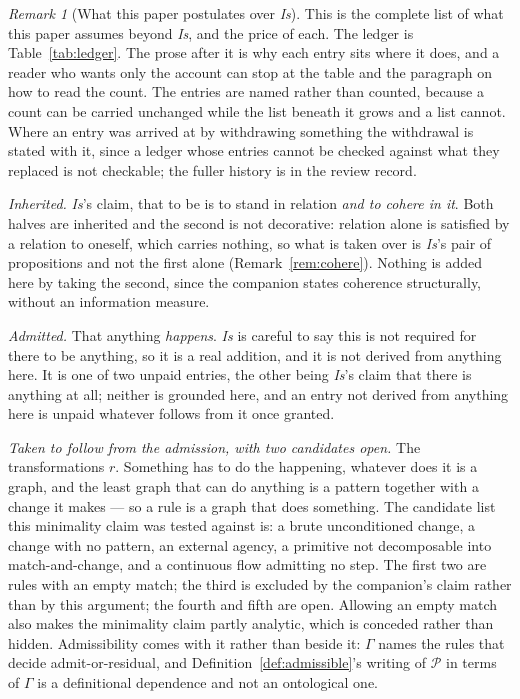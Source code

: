 \documentclass[11pt,a4paper]{article}
\theoremstyle{remark}\newtheorem{remark}[definition]{Remark}
\newcommand{\Poss}{\mathcal{P}}
\begin{document}
\begin{remark}[What this paper postulates over \emph{Is}]\label{rem:inherited}
This is the complete list of what this paper assumes beyond \emph{Is}, and the price of each.
The ledger is Table~\ref{tab:ledger}. The prose after it is why each entry sits where it does, and a reader who wants
only the account can stop at the table and the paragraph on how to read the count. The entries are named
rather than counted, because a count can be carried unchanged while the list beneath it grows and a list
cannot. Where an entry was arrived at by withdrawing something the withdrawal is stated with it, since a
ledger whose entries cannot be checked against what they replaced is not checkable; the fuller history is
in the review record.

\emph{Inherited.} \emph{Is}'s claim, that to be is to stand in relation \emph{and to cohere in it}.
Both halves are inherited and the second is not decorative: relation alone is satisfied by a relation to
oneself, which carries nothing, so what is taken over is \emph{Is}'s pair of propositions and not
the first alone (Remark~\ref{rem:cohere}). Nothing is added here by taking the second, since the
companion states coherence structurally, without an information measure.

\emph{Admitted.} That anything \emph{happens}. \emph{Is} is careful to say this is not required for
there to be anything, so it is a real addition, and it is not derived from anything here. It is one of
two unpaid entries, the other being \emph{Is}'s claim that there is anything at all; neither is
grounded here, and an entry not derived from anything here is unpaid whatever follows from it once
granted.

\emph{Taken to follow from the admission, with two candidates open.} The transformations $r$. Something has to do the happening, whatever
does it is a graph, and the least graph that can do anything is a pattern together with a change it
makes --- so a rule is a graph that does something. The candidate
list this minimality claim was tested against is: a brute unconditioned change, a change with no
pattern, an external agency, a primitive not decomposable into match-and-change, and a continuous flow
admitting no step. The first two are rules with an empty match; the third is excluded by the
companion's claim rather than by this argument; the fourth and fifth are open. Allowing an empty match
also makes the minimality claim partly analytic, which is conceded rather than hidden. Admissibility comes with it rather than beside it:
$\Gamma$ names the rules that decide admit-or-residual, and Definition~\ref{def:admissible}'s writing
of $\Poss$ in terms of $\Gamma$ is a definitional dependence and not an ontological one.


\end{remark}
\end{document}
